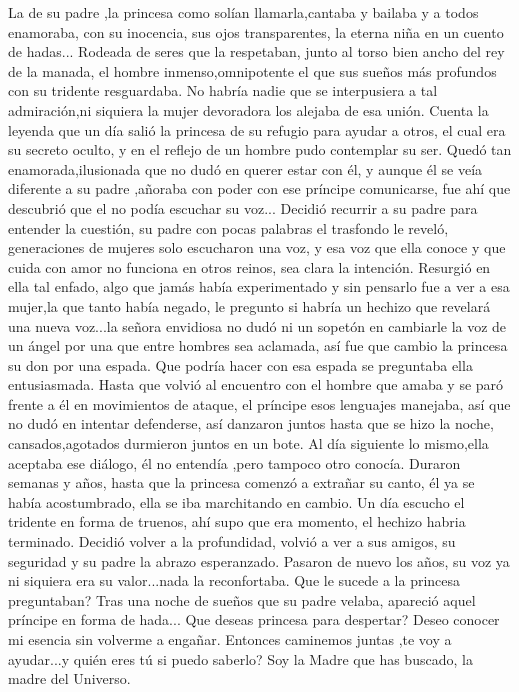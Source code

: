 \documentclass[12pt, a4paper, twoside]{book} %
\begin{document}
La de su padre ,la princesa como solían llamarla,cantaba y bailaba y a todos enamoraba, con su inocencia, sus ojos transparentes, la eterna niña en un cuento de hadas...
Rodeada de seres que la respetaban, junto al torso bien ancho del rey de la manada, el hombre inmenso,omnipotente el que sus sueños más profundos con su tridente resguardaba.
No habría nadie que se interpusiera a tal admiración,ni siquiera la mujer devoradora los alejaba de esa unión.
Cuenta la leyenda que un día salió la princesa de su refugio para ayudar a otros, el cual era su secreto oculto, y en el reflejo de un hombre pudo contemplar su ser.
Quedó tan enamorada,ilusionada que no dudó en querer estar con él, y aunque él se veía diferente a su padre ,añoraba con poder con ese príncipe comunicarse, fue ahí que descubrió que el no podía escuchar su voz...
Decidió recurrir a su padre para entender la cuestión, su padre con pocas palabras el trasfondo le reveló, generaciones de mujeres solo escucharon una voz, y esa voz que ella conoce y que cuida con amor no funciona en otros reinos, sea clara la intención. Resurgió en ella tal enfado, algo que jamás había experimentado y sin pensarlo fue a ver a esa mujer,la que tanto había negado, le pregunto si habría un hechizo que revelará una nueva voz...la señora envidiosa no dudó ni un sopetón en cambiarle la voz de un ángel por una que entre hombres sea aclamada, así  fue que cambio la princesa su don por una espada.
Que podría hacer con esa espada se preguntaba ella entusiasmada.
Hasta que volvió al encuentro con el hombre que amaba y se paró frente a él en movimientos de ataque, el príncipe esos lenguajes manejaba, así que no dudó en intentar defenderse, así danzaron juntos hasta que se hizo la noche, cansados,agotados durmieron juntos en un bote.
Al día siguiente lo mismo,ella aceptaba ese diálogo, él no entendía ,pero tampoco otro conocía.
Duraron semanas y años, hasta que la princesa comenzó a extrañar su canto, él ya se había acostumbrado, ella se iba marchitando en cambio.
Un día escucho el tridente en forma de truenos, ahí supo que era momento, el hechizo habria terminado.
Decidió volver a la profundidad, volvió a ver a sus amigos, su seguridad y su padre la abrazo esperanzado.
Pasaron de nuevo los años, su voz ya ni siquiera era su valor...nada la reconfortaba.
Que le sucede a la princesa preguntaban?
Tras una noche de sueños que su padre velaba, apareció aquel príncipe en forma de  hada...
Que deseas princesa para despertar? Deseo conocer mi esencia sin volverme a engañar.
Entonces caminemos juntas ,te voy a ayudar...y quién eres tú si puedo saberlo?
Soy la Madre que has buscado, la madre del Universo.
\end{document}
